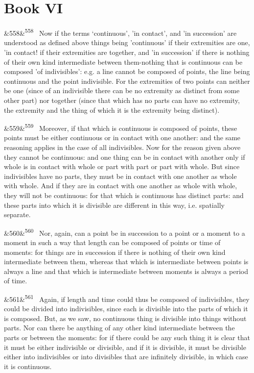 \documentclass[12pt]{article}
\newcommand{\para}[1][]{\par\noindent\ifx&#1&\else\textsuperscript{\footnotesize #1}~\fi}
\begin{document}
\section*{Book VI}

\para[558] Now if the terms ‘continuous’, 'in contact', and 'in succession' are understood as defined above things being 'continuous' if their extremities are one, 'in contact! if their extremities are together, and 'in succession' if there is nothing of their own kind intermediate between them-nothing that is continuous can be composed 'of indivisibles': e.g. a line cannot be composed of points, the line being continuous and the point indivisible. For the extremities of two points can neither be one (since of an indivisible there can be no extremity as distinct from some other part) nor together (since that which has no parts can have no extremity, the extremity and the thing of which it is the extremity being distinct).

\para[559] Moreover, if that which is continuous is composed of points, these points must be either continuous or in contact with one another: and the same reasoning applies in the case of all indivisibles. Now for the reason given above they cannot be continuous: and one thing can be in contact with another only if whole is in contact with whole or part with part or part with whole. But since indivisibles have no parts, they must be in contact with one another as whole with whole. And if they are in contact with one another as whole with whole, they will not be continuous: for that which is continuous has distinct parts: and these parts into which it is divisible are different in this way, i.e. spatially separate.

\para[560] Nor, again, can a point be in succession to a point or a moment to a moment in such a way that length can be composed of points or time of moments: for things are in succession if there is nothing of their own kind intermediate between them, whereas that which is intermediate between points is always a line and that which is intermediate between moments is always a period of time.

\para[561] Again, if length and time could thus be composed of indivisibles, they could be divided into indivisibles, since each is divisible into the parts of which it is composed. But, as we saw, no continuous thing is divisible into things without parts. Nor can there be anything of any other kind intermediate between the parts or between the moments: for if there could be any such thing it is clear that it must be either indivisible or divisible, and if it is divisible, it must be divisible either into indivisibles or into divisibles that are infinitely divisible, in which case it is continuous.
\end{document}
